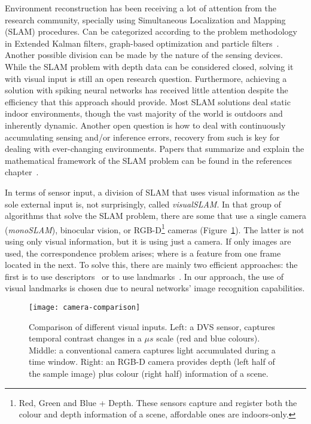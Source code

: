 Environment reconstruction has been receiving a lot of attention from the research  community, specially using Simultaneous Localization and Mapping (SLAM) procedures. Can be categorized according to the problem methodology in Extended Kalman filters, graph-based optimization and particle filters~\cite{Thrun2008_SLAM}. Another possible division can be made by the nature of the sensing devices. While the SLAM problem with depth data can be considered closed, solving it with visual input is still an open research question. Furthermore, achieving a solution with spiking neural networks has received little attention despite the efficiency that this approach should provide. Most SLAM solutions deal static indoor environments, though the vast majority of the world is outdoors and inherently dynamic. Another open question is how to deal with continuously accumulating sensing and/or inference errors, recovery from such is key for dealing with ever-changing environments. Papers that summarize and explain the mathematical framework of the SLAM problem can be found in the references chapter~\cite{Thrun2008_SLAM,Fuentes-Pacheco2012-slam,durrant2006simultaneous,bailey2006simultaneous}. 

In terms of sensor input, a division of SLAM that uses visual information as the sole external input is, not surprisingly, called \emph{visualSLAM}. In that group of algorithms that solve the SLAM problem, there are some that use a single camera (\emph{monoSLAM}), binocular vision, or RGB-D\footnote{Red, Green and Blue + Depth. These sensors capture and register both the colour and depth information of a scene, affordable ones are indoors-only.} cameras (Figure~\ref{fig:slam:camera-comparison}). The latter is not using only visual information, but it is using just a camera. If only images are used, the correspondence problem arises; where is a feature from one frame located in the next. To solve this, there are mainly two efficient approaches: the first is to use descriptors~\cite{lowe1999object,bay2006surf,alahi2012freak} or to use landmarks~\cite{sola2012impact,frintrop2006attentional}. In our approach, the use of visual landmarks is chosen due to neural networks' image recognition capabilities. 

\begin{figure}[h]
  \begin{center}
    \texttt{[image: camera-comparison]}
    \caption{Comparison of different visual inputs. Left: a DVS sensor, captures temporal contrast changes in a $\mu s$ scale (red and blue colours). Middle: a conventional camera captures light accumulated during a time window. Right: an RGB-D camera provides depth (left half of the sample image) plus colour (right half) information of a scene.}
    \label{fig:slam:camera-comparison}
  \end{center}
\end{figure}

